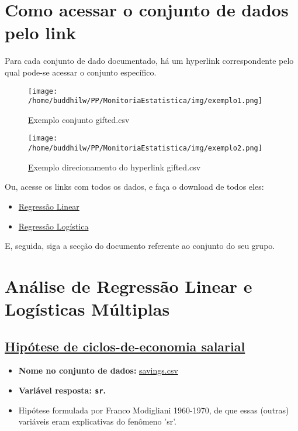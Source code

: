 \documentclass[12pt]{article}
\date{\today}
\title{}
\begin{document}
\tableofcontents
\clearpage


\section{Como acessar o conjunto de dados pelo link}
\label{sec:org484c5e1}
Para cada conjunto de dado documentado, há um hyperlink correspondente
pelo qual pode-se acessar o conjunto específico.

{\begin{figure}[!htbp]
    \caption{\href{img/exemplo1.png} Exemplo conjunto gifted.csv}
    \centering
    \texttt{[image: /home/buddhilw/PP/MonitoriaEstatistica/img/exemplo1.png]}
\end{figure}}


{\begin{figure}[!htbp]
    \centering
    \caption{\href{img/exemplo2.png}Exemplo direcionamento do hyperlink gifted.csv}
    \texttt{[image: /home/buddhilw/PP/MonitoriaEstatistica/img/exemplo2.png]}
\end{figure}}

Ou, acesse os links com todos os dados, e faça o download de todos eles:
\begin{itemize}
\item \href{https://drive.google.com/drive/folders/1SaXLjwvKd\_z6xSQRIs6rxKnOJ7uQguSW?usp=sharing}{Regressão Linear}
\item \href{https://drive.google.com/drive/folders/1BtrKdgg1WzPDfKrSNckv8RcF8DWt-W3F?usp=sharing}{Regressão Logística}
\end{itemize}

E, seguida, siga a secção do documento referente ao conjunto do seu grupo.

\clearpage
\section{Análise de Regressão Linear e Logísticas Múltiplas}
\label{sec:orgd25db30}
\subsection{\href{https://r-data.pmagunia.com/dataset/r-dataset-package-datasets-lifecyclesavings}{Hipótese de ciclos-de-economia salarial}}
\label{sec:orge5e52b7}
\begin{itemize}
\item \textbf{Nome no conjunto de dados:} \href{https://drive.google.com/file/d/1j2K7J1rb3V2Qr\_t0rcBhA6tyuqh88AjY/view?usp=sharing}{savings.csv}
\item \textbf{Variável resposta: \texttt{sr}.}
\item Hipótese formulada por Franco Modigliani 1960-1970, de que essas (outras)
variáveis eram explicativas do fenômeno 'sr'.
\end{itemize}
\end{document}
